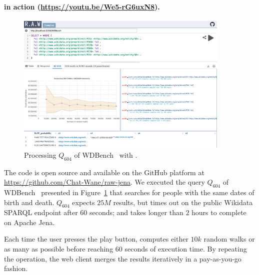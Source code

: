 \paragraph{\NAME in action (\url{https://youtu.be/We5-rG6uxN8}).}


 \begin{figure}
   \centering
   \includegraphics[width=0.91\textwidth]{figures/raw_screenshot.png}
   \caption{\label{fig:raw_screenshot} Processing $Q_{604}$ of
     WDBench~\cite{angles2022wdbench} with \NAME.}
 \end{figure}

The code is open source and available on the GitHub platform at
\url{https://github.com/Chat-Wane/raw-jena}.  We executed the query
$Q_{604}$ of WDBench~\cite{angles2022wdbench} presented in
Figure~\ref{fig:raw_screenshot} that searches for people with the same
dates of birth and death. $Q_{604}$ expects $25M$ results, but times
out on the public Wikidata SPARQL endpoint after $60$ seconds; and
takes longer than $2$ hours to complete on Apache Jena.


\noindent Each time the user presses the play button, \NAME computes
either $10k$ random walks or as many as possible before reaching $60$
seconds of execution time. By repeating the operation, the web client
merges the results iteratively in a pay-as-you-go fashion.



